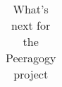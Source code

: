 \begin{table}
{\begin{tabular}{|p{\textwidth}|}
\end{tabular}
}
\caption{What's next for the Peeragogy project\label{tab:WhatsNextSummary}}
\end{table}










